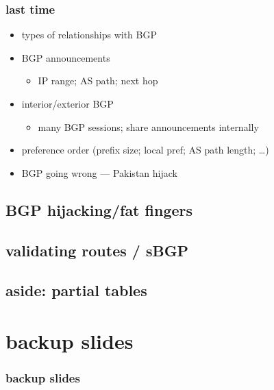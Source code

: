 \date{}
\title{}
\date{}

\begin{frame}
    \titlepage
\end{frame}

\begin{frame}
\frametitle{last time}
\begin{itemize}
\item types of relationships with BGP
\item BGP announcements
    \begin{itemize}
    \item IP range; AS path; next hop
    \end{itemize}
\item interior/exterior BGP
    \begin{itemize}
    \item many BGP sessions; share announcements internally
    \end{itemize}
\item preference order (prefix size; local pref; AS path length; \ldots)
\item BGP going wrong --- Pakistan hijack
\end{itemize}
\end{frame}

\subsection{BGP hijacking/fat fingers}


\subsection{validating routes / sBGP}



\subsection{aside: partial tables}




\section{backup slides}
\begin{frame}\frametitle{backup slides}
\end{frame}


